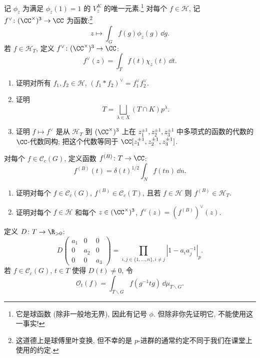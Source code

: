 记 $\phi_z$ 为满足 $\phi_z(1) = 1$ 的 $V_z^K$ 的唯一元素.\footnote{它是球函数 (除非一般地无界), 因此有记号 $\phi$. 但除非你先证明它, 不能使用这一事实!} 对每个 $f \in \mathcal{H}$, 记 $f^{\vee} \colon (\CC^{\times})^3 \to \CC$ 为函数:\footnote{这道德上是球傅里叶变换, 但不幸的是 $p$-进群的通常约定不同于我们在课堂上使用的约定.}
\[
z \longmapsto \int_G f(g)\phi_z(g)\,\dd g.
\]
若 $f \in \mathcal{H}_T$, 定义 $f^{\vee} \colon (\CC^{\times})^3 \to \CC$:
\[
f^{\vee}(z) = \int_T f(t)\chi_z(t)\,\dd t.
\]
\begin{enumerate}
\item[(7)] 证明对所有 $f_1, f_2 \in \mathcal{H}$, $(f_1 * f_2)^{\vee} = f_1^{\vee}f_2^{\vee}$.
\item[(8)] 证明
\[
T = \bigsqcup_{\lambda \in X}(T \cap K)p^{\lambda}.
\]
\item[(9)] 证明 $f \longmapsto f^{\vee}$ 是从 $\mathcal{H}_T$ 到 $(\CC^{\times})^3$ 上在 $z_1^{\pm 1}, z_2^{\pm 1}, z_3^{\pm 1}$ 中多项式的函数的代数的 $\CC$-代数同构; 把这个代数等同于 $\CC[z_1^{\pm 1}, z_2^{\pm 1}, z_3^{\pm 1}]$.
\end{enumerate}
对每个 $f \in \mathcal{C}_c(G)$, 定义函数 $f^{(B)} \colon T \to \CC$:
\[
f^{(B)}(t) = \delta(t)^{1/2}\int_N f(tn)\,\dd n.
\]
\begin{enumerate}
\item[(10)] 证明对每个 $f \in \mathcal{C}_c(G)$, $f^{(B)} \in \mathcal{C}_c(T)$, 且若 $f \in \mathcal{H}$ 则 $f^{(B)} \in \mathcal{H}_T$.
\item[(11)] 证明对每个 $f \in \mathcal{H}$ 和每个 $z \in (\CC^{\times})^3$, $f^{\vee}(z) = (f^{(B)})^{\vee}(z)$.
\end{enumerate}
定义 $D \colon T \to \R_{>0}$:
\[
D\begin{pmatrix} a_1 & 0 & 0 \\ 0 & a_2 & 0 \\ 0 & 0 & a_3 \end{pmatrix} = \prod_{i,j \in \{1,\ldots,n\}, i \neq j}|1 - a_ia_j^{-1}|_p.
\]
若 $f \in \mathcal{C}_c(G)$, $t \in T$ 使得 $D(t) \neq 0$, 令
\[
\mathcal{O}_t(f) = \int_{T\backslash G}f(g^{-1}tg)\,\dd\mu_{T\backslash G}.
\]

